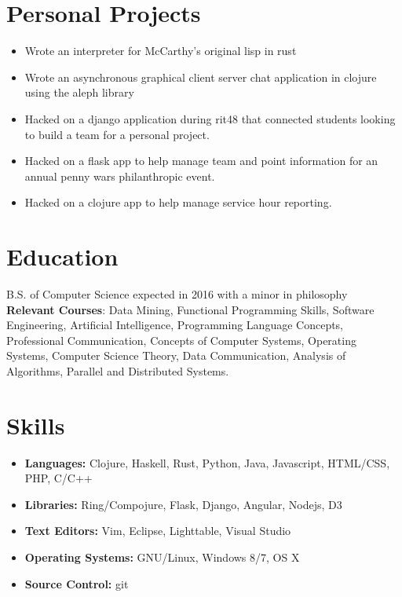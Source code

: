 \documentclass[line]{res}
\begin{document}
\address{8126 Lakeshore Rd, Burtchville, MI, 48059}
\address{(810) 304 - 6041 \\ rps9530@rit.edu \\ github.com/esapyr}

\begin{resume}
\begin{multicols}{2}

\section{Personal Projects}
\begin{itemize}
    \item Wrote an interpreter for McCarthy's original lisp in rust
    \item Wrote an asynchronous graphical client server chat application in clojure using the aleph library
    \item Hacked on a django application during rit48 that connected students looking to build a team for a personal project. 
    \item Hacked on a flask app to help manage team and point information for an annual penny wars philanthropic event.
    \item Hacked on a clojure app to help manage service hour reporting.
\end{itemize}

\section{Education}
B.S. of Computer Science expected in 2016 with a minor in philosophy 
\\
\textbf{Relevant Courses}: Data Mining, Functional Programming Skills, Software Engineering, Artificial Intelligence, 
Programming Language Concepts, Professional Communication, Concepts of Computer Systems, Operating Systems, 
Computer Science Theory, Data Communication, Analysis of Algorithms, Parallel and Distributed Systems.

\section{Skills}
\begin{itemize}
    \item \textbf{Languages:} Clojure, Haskell, Rust, Python, Java, Javascript, HTML/CSS, PHP, C/C++
    \item \textbf{Libraries:} Ring/Compojure, Flask, Django, Angular, Nodejs, D3
    \item \textbf{Text Editors:} Vim, Eclipse, Lighttable, Visual Studio
    \item \textbf{Operating Systems:} GNU/Linux, Windows 8/7, OS X
    \item \textbf{Source Control:} git
\end{itemize}


\end{multicols}
\end{resume}
\end{document}
